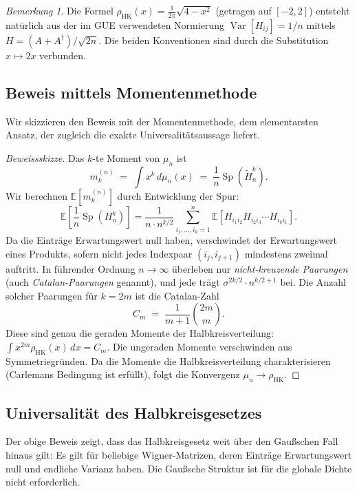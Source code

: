 \documentclass[12pt,a4paper]{amsart}
\theoremstyle{definition}
\theoremstyle{remark}
\newtheorem{bemerkung}[theorem]{Bemerkung}
\begin{document}
\begin{bemerkung}
Die Formel $\rho_{\mathrm{HK}}(x) = \frac{1}{2\pi}\sqrt{4-x^2}$ (getragen
auf $[-2,2]$) entsteht natürlich aus der im GUE verwendeten Normierung
$\operatorname{Var}[H_{ij}] = 1/n$ mittels $H = (A + A^\dagger)/\sqrt{2n}$.
Die beiden Konventionen sind durch die Substitution $x \mapsto 2x$ verbunden.
\end{bemerkung}

\subsection{Beweis mittels Momentenmethode}

Wir skizzieren den Beweis mit der Momentenmethode, dem elementarsten Ansatz,
der zugleich die exakte Universalitätsaussage liefert.

\begin{proof}[Beweissskizze]
Das $k$-te Moment von $\mu_n$ ist
\[
  m_k^{(n)} \;=\; \int x^k\,d\mu_n(x)
  \;=\; \frac{1}{n}\operatorname{Sp}(\tilde{H}_n^k).
\]
Wir berechnen $\mathbb{E}[m_k^{(n)}]$ durch Entwicklung der Spur:
\[
  \mathbb{E}\!\left[\frac{1}{n}\operatorname{Sp}(H_n^k)\right]
  = \frac{1}{n \cdot n^{k/2}} \sum_{i_1,\ldots,i_k=1}^n
    \mathbb{E}[H_{i_1 i_2} H_{i_2 i_3} \cdots H_{i_k i_1}].
\]
Da die Einträge Erwartungswert null haben, verschwindet der Erwartungswert
eines Produkts, sofern nicht jedes Indexpaar $(i_j, i_{j+1})$ mindestens
zweimal auftritt. In führender Ordnung $n \to \infty$ überleben nur
\emph{nicht-kreuzende Paarungen} (auch \emph{Catalan-Paarungen} genannt),
und jede trägt $\sigma^{2k/2} \cdot n^{k/2+1}$ bei.
Die Anzahl solcher Paarungen für $k = 2m$ ist die Catalan-Zahl
\[
  C_m \;=\; \frac{1}{m+1}\binom{2m}{m}.
\]
Diese sind genau die geraden Momente der Halbkreisverteilung:
$\int x^{2m}\rho_{\mathrm{HK}}(x)\,dx = C_m$.
Die ungeraden Momente verschwinden aus Symmetriegründen. Da die Momente
die Halbkreisverteilung charakterisieren (Carlemans Bedingung ist erfüllt),
folgt die Konvergenz $\mu_n \to \rho_{\mathrm{HK}}$.
\end{proof}

\subsection{Universalität des Halbkreisgesetzes}

Der obige Beweis zeigt, dass das Halbkreisgesetz weit über den Gaußschen
Fall hinaus gilt: Es gilt für beliebige Wigner-Matrizen, deren Einträge
Erwartungswert null und endliche Varianz haben. Die Gaußsche Struktur ist
für die globale Dichte nicht erforderlich.
\end{document}
